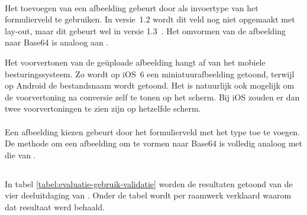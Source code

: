 \paragraph{\jqm}
Het toevoegen van een afbeelding gebeurt door  als invoertype van het formulierveld te gebruiken. 
In versie~1.2 wordt dit veld nog niet opgemaakt met lay-out, maar dit gebeurt wel in versie 1.3~\cite{JQuery2013d}. 
Het omvormen van de afbeelding naar Base64 is analoog aan \kendo{}.

Het voorvertonen van de geüploade afbeelding hangt af van het mobiele besturingssysteem.
Zo wordt op iOS~6 een miniatuurafbeelding getoond, terwijl op Android de bestandsnaam wordt getoond.
Het is natuurlijk ook mogelijk om de voorvertoning na conversie zelf te tonen op het scherm.
Bij iOS zouden er dan twee voorvertoningen te zien zijn op hetzelfde scherm.

\paragraph{\lungo}
Een afbeelding kiezen gebeurt door het formulierveld met het type  toe te voegen.
De methode om een afbeelding om te vormen naar Base64 is volledig analoog met die van \kendo{}.


\subsection{}
\label{sec:evaluatie-gebruik-validatie}

In tabel \ref{tabel:evaluatie-gebruik-validatie} worden de resultaten getoond van de vier deeluitdaging van .
Onder de tabel wordt per raamwerk verklaard waarom dat resultaat werd behaald.


\begin{table}[H]
\centering
{}
\caption{Gebruik van  voor \st{}~(\sta), \kendo{}~(\kendoa), \jqm{}~(\jqma) en \lungo{}~(\lungoa).}
\label{tabel:evaluatie-gebruik-validatie}
\end{table}

